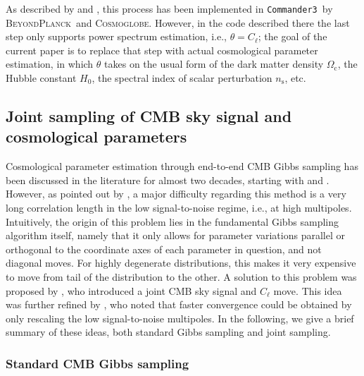 \documentclass[twocolumn]{../common/aa}
\def\commanderthree{\texttt{Commander3}}
\newcommand{\BP}{\textsc{BeyondPlanck}}
\newcommand{\Cosmoglobe}{\textsc{Cosmoglobe}}
\begin{document}
As described by \citet{bp01} and \citet{watts2023_dr1}, this process has been implemented in \commanderthree\ by \BP\ and \Cosmoglobe. However, in the code described there the last step only supports power spectrum estimation, i.e., $\theta = C_{\ell}$; the goal of the current paper is to replace that step with actual cosmological parameter estimation, in which $\theta$ takes on the usual form of the dark matter density $\Omega_\mathrm{c}$, the Hubble constant $H_0$, the spectral index of scalar perturbation $n_\mathrm{s}$, etc.

\subsection{Joint sampling of CMB sky signal and cosmological parameters}

Cosmological parameter estimation through end-to-end CMB Gibbs sampling has been discussed in the literature for almost two decades, starting with \citet{jewell2004} and \citet{wandelt2004}. However, as pointed out by \citet{eriksen:2004}, a major difficulty regarding this method is a very long correlation length in the low signal-to-noise regime, i.e., at high multipoles. Intuitively, the origin of this problem lies in the fundamental Gibbs sampling algorithm itself, namely that it only allows for parameter variations parallel or orthogonal to the coordinate axes of each parameter in question, and not diagonal moves. For highly degenerate distributions, this makes it very expensive to move from tail of the distribution to the other. A solution to this problem was proposed by \citet{jewell:2009}, who introduced a joint CMB sky signal and $C_\ell$ move. This idea was further refined by \citet{racine:2016}, who noted that faster convergence could be obtained by only rescaling the low signal-to-noise multipoles. In the following, we give a brief summary of these ideas, both standard Gibbs sampling and joint sampling.

\subsubsection{Standard CMB Gibbs sampling}
\label{sec:gibbs}
\end{document}
